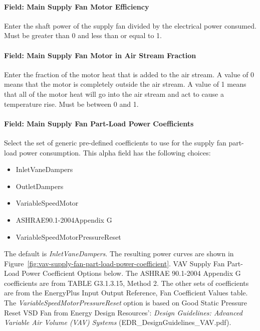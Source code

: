 \paragraph{Field: Main Supply Fan Motor Efficiency}\label{field-main-supply-fan-motor-efficiency}

Enter the shaft power of the supply fan divided by the electrical power consumed. Must be greater than 0 and less than or equal to 1.

\paragraph{Field: Main Supply Fan Motor in Air Stream Fraction}\label{field-main-supply-fan-motor-in-air-stream-fraction}

Enter the fraction of the motor heat that is added to the air stream. A value of 0 means that the motor is completely outside the air stream. A value of 1 means that all of the motor heat will go into the air stream and act to cause a temperature rise. Must be between 0 and 1.

\paragraph{Field: Main Supply Fan Part-Load Power Coefficients}\label{field-main-supply-fan-part-load-power-coefficients}

Select the set of generic pre-defined coefficients to use for the supply fan part-load power consumption. This alpha field has the following choices:

\begin{itemize}
\item
  InletVaneDampers
\item
  OutletDampers
\item
  VariableSpeedMotor
\item
  ASHRAE90.1-2004Appendix G
\item
  VariableSpeedMotorPressureReset
\end{itemize}

The default is \emph{InletVaneDampers}. The resulting power curves are shown in Figure~\ref{fig:vav-supply-fan-part-load-power-coefficient}. VAV Supply Fan Part-Load Power Coefficient Options below. The ASHRAE 90.1-2004 Appendix G coefficients are from TABLE G3.1.3.15, Method 2. The other sets of coefficients are from the EnergyPlus Input Output Reference, Fan Coefficient Values table. The \emph{VariableSpeedMotorPressureReset} option is based on Good Static Pressure Reset VSD Fan from Energy Design Resources': \emph{Design Guidelines: Advanced Variable Air Volume (VAV) Systems} (EDR\_DesignGuidelines\_VAV.pdf).

